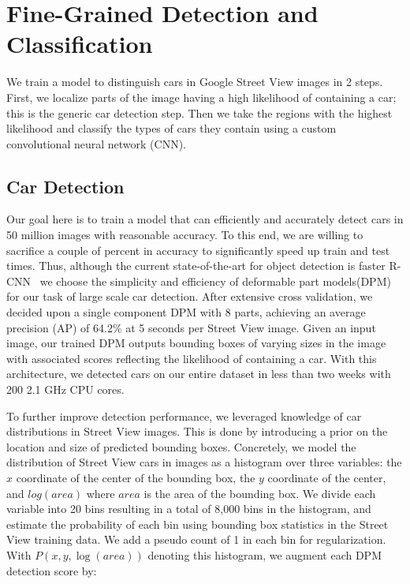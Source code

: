 \documentclass[letterpaper]{article}
\begin{document}
\section{Fine-Grained Detection and Classification}
\label{sec:detection}
We train a model to distinguish cars in Google Street View images in 2 steps. First, we localize parts of the image having a high likelihood of containing a car; this is the generic car detection step. Then we take the regions with the highest likelihood and classify the types of cars they contain using a custom convolutional neural network (CNN). 

\subsection{Car Detection}
Our goal here is to train a model that can efficiently and accurately detect cars in 50 million images with reasonable accuracy. To this end, we are willing to sacrifice a couple of percent in accuracy to significantly speed up train and test times. Thus, although the current state-of-the-art for object detection is faster R-CNN~\cite{frcnn} we choose the simplicity and efficiency of deformable part models(DPM)~\cite{dpm} for our task of large scale car detection. 
After extensive cross validation, we decided upon a single component DPM with 8 parts, achieving an average precision (AP) of 64.2\% at 5 seconds per Street View image. Given an input image, our trained DPM outputs bounding boxes of varying sizes in the image with associated scores reflecting the likelihood of containing a car. With this architecture, we detected cars on our entire dataset in less than two weeks with 200 2.1 GHz CPU cores.

To further improve detection performance, we leveraged knowledge of car distributions in Street View images. This is done by introducing a prior on the location and size of predicted bounding boxes. Concretely, we model the distribution of Street View cars in images as a histogram over three variables: the $x$ coordinate of the center of the bounding box, the $y$ coordinate of the center, and $log(area)$ where $area$ is the area of the bounding box. We divide each variable into 20 bins resulting in a total of 8,000 bins in the histogram, and estimate the probability of each bin using bounding box statistics in the Street View training data. We add a pseudo count of 1 in each bin for regularization. With $P(x,y,\log{(area)})$ denoting this histogram, we augment each DPM detection score by:
\end{document}
